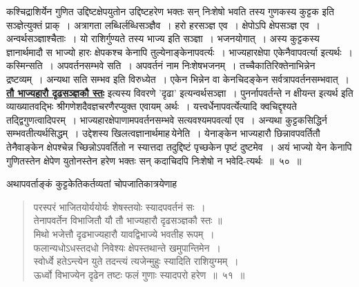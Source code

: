 \documentclass[11pt, openany]{book}
\begin{document}
{{ कश्चिद्राशिर्येन गुणित उद्दिष्टक्षेपयुतोन उद्दिष्टहरेण भक्तः सन् निःशेषो भवति 
तस्य गुणकस्य कुट्टक इति सञ्ज्ञेत्युक्तं प्राक्~। अत्रागता लब्धिर्लब्धिसञ्ज्ञैव~। 
हरो हरसञ्ज्ञ एव~। क्षेपोऽपि क्षेपसञ्ज्ञ एव~। अन्वर्थसञ्ज्ञाश्चैताः~। यो राशिर्गुण्यते 
तस्य भाज्य इति सञ्ज्ञा~। भजनयोगात्~। अस्य कुट्टकस्य ज्ञानार्थमादौ स भाज्यो 
हारः क्षेपकश्च केनापि तुल्येनाङ्केनापवर्त्यः~। भाज्यहारक्षेपा एकेनैवापवर्त्या इत्यर्थः~। 
कस्मिन्सति~। अपवर्तनसम्भवे सति~। अपवर्तनं नाम निःशेषभजनम्~। 
तच्चैकातिरिक्तेनाभिन्नेन द्रष्टव्यम्~। अन्यथा सति सम्भव इति विरुध्येत~।
एकेन भिन्नेन वा केनचिदङ्केन सर्वत्रापवर्तनसम्भवात्~। \hyperref[51]{\textbf{तौ भाज्यहारौ दृढसञ्ज्ञकौ स्तः}} इत्यस्य विवरणे 'दृढा' इत्यन्वर्थसञ्ज्ञा~। पुनर्नापवर्तन्ते न क्षीयन्त इत्यर्थ इति 
व्याख्यातवद्भिः श्रीगणेशदैवज्ञचरणैरप्युक्त एवायम् अर्थः~।
यत्त्वर्धेनापवर्त्येत्यादि क्वचिद्दृश्यते तद्द्विगुणत्वादिपरम्~। भाज्यहारक्षेपाणामपवर्तनसम्भवे
सत्यवश्यमपवर्त्या एव~। 
अन्यथा कुट्टकसिद्धिर्न सम्भवतीत्यर्थसिद्धम्~। उद्देशस्य
खिलत्वज्ञानार्थमाह\textendash \,येनेति~। 
येनाङ्केन भाज्यहारौ छिन्नावपवर्तितौ तेनैवाङ्केन क्षेपश्चेन्न
च्छिन्नोऽपवर्तितो न स्यात्तदा तदुद्दिष्टं पृच्छकेन पृष्टं दुष्टमेव~। अयं भाज्यो येन केनापि गुणितस्तेन क्षेपेण 
युतोनस्तेन हरेण भक्तः सन् कदाचिदपि निःशेषो न भवेदि-त्यर्थः~॥~५०~॥\\
\vspace{-4mm}

अथापवर्ताङ्कं कुट्टकेतिकर्तव्यतां चोपजातिकात्रयेणाह\textendash 
\newpage

 \label{51}
\begin{quote}
    \ab 
 परस्परं भाजितयोर्ययोर्यः शेषस्तयोः स्यादपवर्तनं सः~। \\
तेनापवर्तेन विभाजितौ यौ तौ भाज्यहारौ दृढसञ्ज्ञकौ स्तः ॥\\

\vspace{-5mm}
मिथो भजेत्तौ दृढभाज्यहारौ यावद्विभाज्ये भवतीह रूपम्~। \\
फलान्यधोऽधस्तदधो निवेश्यः क्षेपस्तथान्ते खमुपान्तिमेन~। \\

\vspace{-5mm}
 स्वोर्ध्वे हतेऽन्त्येन युते तदन्त्यं त्यजेन्मुहुः स्यादिति राशियुग्मम्~। \\
 ऊर्ध्वो विभाज्येन दृढेन तष्टः फलं गुणाः स्यादपरो हरेण~॥~५१~॥
\end{quote}

}}
\end{document}
